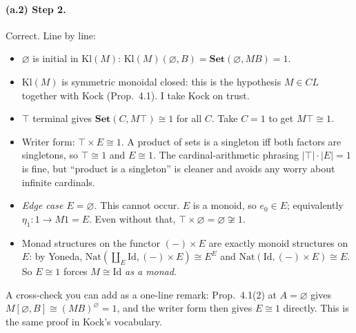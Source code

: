 \documentclass[11pt]{article}
\newcommand{\Kl}{\mathrm{Kl}}
\newcommand{\Set}{\mathbf{Set}}
\begin{document}
\paragraph{(a.2) Step 2.} Correct. Line by line:
\begin{itemize}
\item $\varnothing$ is initial in $\Kl(M)$: $\Kl(M)(\varnothing,B)=\Set(\varnothing,MB)=1$. \checkmark
\item $\Kl(M)$ is symmetric monoidal closed: this is the hypothesis $M\in CL$ together with Kock (Prop.~4.1). I take Kock on trust. \checkmark
\item $\top$ terminal gives $\Set(C,M\top)\cong1$ for all $C$. Take $C=1$ to get $M\top\cong1$. \checkmark
\item Writer form: $\top\times E\cong1$. A product of sets is a singleton iff both factors are singletons, so
  $\top\cong1$ and $E\cong1$. The cardinal-arithmetic phrasing $|\top|\cdot|E|=1$ is fine, but ``product is a
  singleton'' is cleaner and avoids any worry about infinite cardinals.
\item \emph{Edge case $E=\varnothing$.} This cannot occur. $E$ is a monoid, so $e_0\in E$; equivalently
  $\eta_1:1\to M1=E$. Even without that, $\top\times\varnothing=\varnothing\not\cong1$. \checkmark
\item Monad structures on the functor $(-)\times E$ are exactly monoid structures on $E$: by Yoneda,
  $\mathrm{Nat}(\coprod_{E}\mathrm{Id},(-)\times E)\cong E^{E}$ and $\mathrm{Nat}(\mathrm{Id},(-)\times E)\cong E$.
  So $E\cong1$ forces $M\cong\mathrm{Id}$ \emph{as a monad}. \checkmark
\end{itemize}
A cross-check you can add as a one-line remark: Prop.~4.1(2) at $A=\varnothing$ gives
$M[\varnothing,B]\cong(MB)^{\varnothing}=1$, and the writer form then gives $E\cong1$ directly. This is the same
proof in Kock's vocabulary.
\end{document}
